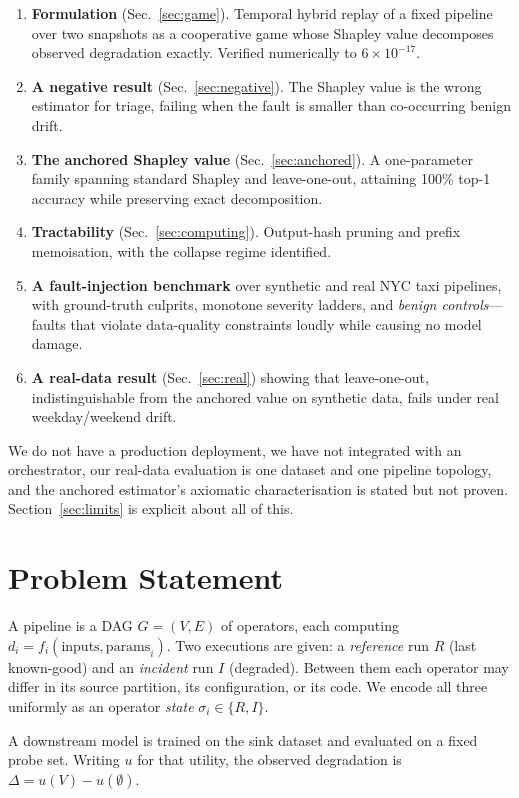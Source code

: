 \documentclass[conference]{IEEEtran}
\begin{document}
\begin{enumerate}
\item \textbf{Formulation} (Sec.~\ref{sec:game}). Temporal hybrid replay of a
fixed pipeline over two snapshots as a cooperative game whose Shapley value
decomposes observed degradation exactly. Verified numerically to
$6\times10^{-17}$.
\item \textbf{A negative result} (Sec.~\ref{sec:negative}). The Shapley value is
the wrong estimator for triage, failing when the fault is smaller than
co-occurring benign drift.
\item \textbf{The anchored Shapley value} (Sec.~\ref{sec:anchored}). A
one-parameter family spanning standard Shapley and leave-one-out, attaining
100\% top-1 accuracy while preserving exact decomposition.
\item \textbf{Tractability} (Sec.~\ref{sec:computing}). Output-hash pruning and
prefix memoisation, with the collapse regime identified.
\item \textbf{A fault-injection benchmark} over synthetic and real NYC taxi
pipelines, with ground-truth culprits, monotone severity ladders, and
\emph{benign controls}---faults that violate data-quality constraints loudly
while causing no model damage.
\item \textbf{A real-data result} (Sec.~\ref{sec:real}) showing that
leave-one-out, indistinguishable from the anchored value on synthetic data,
fails under real weekday/weekend drift.
\end{enumerate}

We do not have a production deployment, we have not integrated with an
orchestrator, our real-data evaluation is one dataset and one pipeline topology,
and the anchored estimator's axiomatic characterisation is stated but not proven.
Section~\ref{sec:limits} is explicit about all of this.

\section{Problem Statement}

A pipeline is a DAG $G=(V,E)$ of operators, each computing
$d_i = f_i(\text{inputs}, \text{params}_i)$. Two executions are given: a
\emph{reference} run $R$ (last known-good) and an \emph{incident} run $I$
(degraded). Between them each operator may differ in its source partition, its
configuration, or its code. We encode all three uniformly as an operator
\emph{state} $\sigma_i \in \{R, I\}$.

A downstream model is trained on the sink dataset and evaluated on a fixed probe
set. Writing $u$ for that utility, the observed degradation is
$\Delta = u(V) - u(\emptyset)$.
\end{document}

